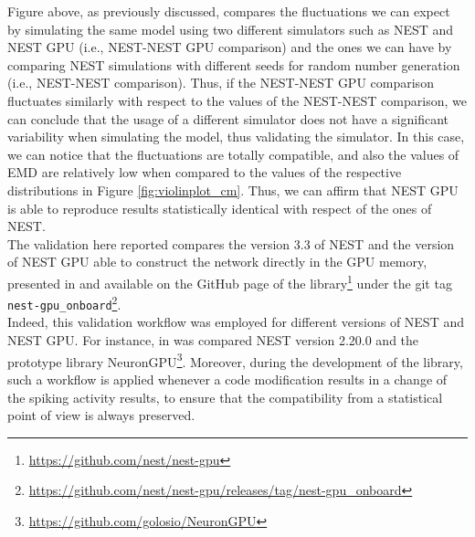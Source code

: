 \documentclass[a4paper, 12pt, twoside, openright]{book}
\begin{document}
Figure above, as previously discussed, compares the fluctuations we can expect by simulating the same model using two different simulators such as NEST and NEST GPU (i.e., NEST-NEST GPU comparison) and the ones we can have by comparing NEST simulations with different seeds for random number generation (i.e., NEST-NEST comparison). Thus, if the NEST-NEST GPU comparison fluctuates similarly with respect to the values of the NEST-NEST comparison, we can conclude that the usage of a different simulator does not have a significant variability when simulating the model, thus validating the simulator. In this case, we can notice that the fluctuations are totally compatible, and also the values of EMD are relatively low when compared to the values of the respective distributions in Figure \ref{fig:violinplot_cm}. Thus, we can affirm that NEST GPU is able to reproduce results statistically identical with respect of the ones of NEST.\\
The validation here reported compares the version 3.3 of NEST \cite{nest3.3} and the version of NEST GPU able to construct the network directly in the GPU memory, presented in \cite{Golosio2023} and available on the GitHub page of the library\footnote{\url{https://github.com/nest/nest-gpu}} under the git tag \texttt{nest-gpu\_onboard}\footnote{\url{https://github.com/nest/nest-gpu/releases/tag/nest-gpu_onboard}}.\\
Indeed, this validation workflow was employed for different versions of NEST and NEST GPU. For instance, in \cite{Golosio2021} was compared NEST version 2.20.0 \cite{nest2.20.0} and the prototype library NeuronGPU\footnote{\url{https://github.com/golosio/NeuronGPU}}. Moreover, during the development of the library, such a workflow is applied whenever a code modification results in a change of the spiking activity results, to ensure that the compatibility from a statistical point of view is always preserved.
\end{document}

